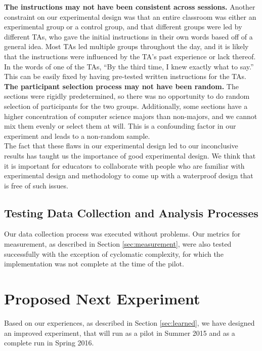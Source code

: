\documentclass[11pt,letterpaper]{article}
\begin{document}
\textbf{The instructions may not have been consistent across sessions.}
Another constraint on our experimental design was that an entire classroom was either an experimental group or a control group, and that different groups were led by different TAs, who gave the initial instructions in their own words based off of a general idea. Most TAs led multiple groups throughout the day, and it is likely that the instructions were influenced by the TA's past experience or lack thereof. In the words of one of the TAs, ``By the third time, I knew exactly what to say.'' This can be easily fixed by having pre-tested written instructions for the TAs.\\

\textbf{The participant selection process may not have been random.}
The sections were rigidly predetermined, so there was no opportunity to do random selection of participants for the two groups. Additionally, some sections have a higher concentration of computer science majors than non-majors, and we cannot mix them evenly or select them at will. This is a confounding factor in our experiment and leads to a non-random sample.\\

The fact that these flaws in our experimental design led to our inconclusive results has taught us the importance of good experimental design. We think that it is important for educators to collaborate with people who are familiar with experimental design and methodology to come up with a waterproof design that is free of such issues.

\subsection{Testing Data Collection and Analysis Processes}
Our data collection process was executed without problems. Our metrics for measurement, as described in Section \ref{sec:measurement}, were also tested successfully with the exception of cyclomatic complexity, for which the implementation was not complete at the time of the pilot.

\section{Proposed Next Experiment}
\label{sec:next}

Based on our experiences, as described in Section \ref{sec:learned}, we have designed an improved experiment, that will run as a pilot in Summer 2015 and as a complete run in Spring 2016.\\
\end{document}
